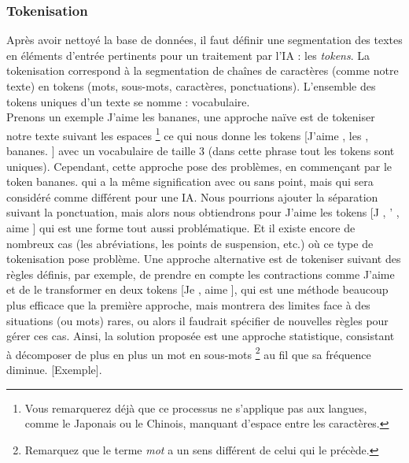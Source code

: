\documentclass[12pt, french, twoside]{report}
\begin{document}
\subsubsection{Tokenisation}
Après avoir nettoyé la base de données, il faut définir une segmentation des textes en éléments d'entrée pertinents pour un traitement par l'IA : les \textit{tokens}. La tokenisation correspond à la segmentation de chaînes de caractères (comme notre texte) en tokens (mots, sous-mots, caractères, ponctuations). L'ensemble des tokens uniques d'un texte se nomme : vocabulaire.\\
\indent Prenons un exemple \og J'aime les bananes\fg, une approche naïve est de tokeniser notre texte suivant les espaces \footnote{Vous remarquerez déjà que ce processus ne s'applique pas aux langues, comme le Japonais ou le Chinois, manquant d'espace entre les caractères.} ce qui nous donne les tokens [\og J'aime \fg, \og les \fg, \og bananes. \fg] avec un vocabulaire de taille 3 (dans cette phrase tout les tokens sont uniques). Cependant, cette approche pose des problèmes, en commençant par le token \og bananes. \fg{} qui a la même signification avec ou sans point, mais qui sera considéré comme différent pour une IA. Nous pourrions ajouter la séparation suivant la ponctuation, mais alors nous obtiendrons pour \og J'aime \fg{} les tokens [\og J \fg, \og ' \fg, \og aime \fg] qui est une forme tout aussi problématique. Et il existe encore de nombreux cas (les abréviations, les points de suspension, etc.) où ce type de tokenisation pose problème. Une approche alternative est de tokeniser suivant des règles définis, par exemple, de prendre en compte les contractions comme \og J'aime \fg{} et de le transformer en deux tokens [\og Je \fg, \og aime \fg], qui est une méthode beaucoup plus efficace que la première approche, mais montrera des limites face à des situations (ou mots) rares, ou alors il faudrait spécifier de nouvelles règles pour gérer ces cas. Ainsi, la solution proposée est une approche statistique, consistant à décomposer de plus en plus un mot en sous-mots \footnote{Remarquez que le terme \textit{mot} a un sens différent de celui qui le précède.} au fil que sa fréquence diminue. [Exemple].\\
\end{document}
